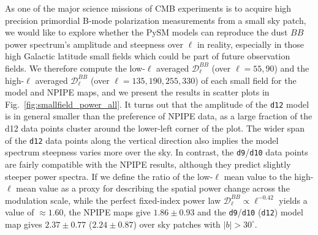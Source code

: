 \documentclass[twocolumn]{aastex631}
\begin{document}

As one of the major science missions of CMB experiments is to acquire high precision primordial B-mode polarization measurements from a small sky patch, we would like to explore whether the PySM models can reproduce the dust $BB$ power spectrum's amplitude and steepness over $\ell$ in reality, especially in those high Galactic latitude small fields which could be part of future observation fields. We therefore compute the low-$\ell$ averaged $\mathcal{D}_\ell^{BB}$ (over $\ell = 55, 90$) and the high-$\ell$ averaged $\mathcal{D}_\ell^{BB}$ (over $\ell = 135, 190, 255, 330$) of each small field for the model and NPIPE maps, and we present the results in scatter plots in Fig.~\ref{fig:smallfield_power_all}. It turns out that the amplitude of the \texttt{d12} model is in general smaller than the preference of NPIPE data, as a large fraction of the d12 data points cluster around the lower-left corner of the plot. The wider span of the \texttt{d12} data points along the vertical direction also implies the model spectrum steepness varies more over the sky. In contrast, the \texttt{d9}/\texttt{d10} data points are fairly compatible with the NPIPE results, although they predict slightly steeper power spectra. If we define the ratio of the low-$\ell$ mean value to the high-$\ell$ mean value as a proxy for describing the spatial power change across the modulation scale, while the perfect fixed-index power law $\mathcal{D}_\ell^{BB} \propto \ell^{-0.42}$ yields a value of $\approx 1.60$, the NPIPE maps give $1.86 \pm 0.93$ and the \texttt{d9}/\texttt{d10} (\texttt{d12}) model map gives $2.37 \pm 0.77$ ($2.24 \pm 0.87$) over sky patches with $|b| > 30^\circ$.
\end{document}
